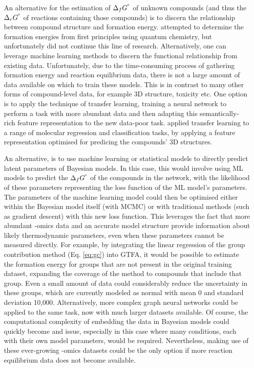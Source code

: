 \documentclass[10pt,letterpaper]{article}
\newcommand{\sdgf}{\Delta_fG^{\degree}}
\newcommand{\sdgr}{\Delta_rG^{\degree}}
\begin{document}
An alternative for the estimation of $\sdgf$ of unknown compounds (and thus the $\sdgr$ of reactions containing those compounds) is to discern the relationship between compound structure and formation energy.
\citet{quantum} attempted to determine the formation energies from first principles using quantum chemistry, but unfortunately did not continue this line of research. %
Alternatively, one can leverage machine learning methods to discern the functional relationship from existing data.
Unfortunately, due to the time-consuming process of gathering formation energy and reaction equilibrium data, there is not a large amount of data available on which to train these models.
This is in contrast to many other forms of compound-level data, for example 3D structure, toxicity etc. %
One option is to apply the technique of transfer learning, training a neural network to perform a task with more abundant data and then adapting this semantically-rich feature representation to the new data-poor task.
\cite{3dinfomax} applied transfer learning to a range of molecular regression and classification tasks, by applying a feature representation optimised for predicing the compounds' 3D structures.

An alternative, is to use machine learning or statistical models to directly predict latent parameters of Bayesian models.
In this case, this would involve using ML models to predict the $\sdgf$ of the compounds in the network, with the likelihood of these parameters representing the loss function of the ML model's parameters.
The parameters of the machine learning model could then be optimised either within the Bayesian model itself (with MCMC) or with traditional methods (such as gradient descent) with this new loss function.
This leverages the fact that more abundant -omics data and an accurate model structure provide information about likely thermodynamic parameters, even when these parameters cannot be measured directly.
For example, by integrating the linear regression of the group contribution method (Eq. \ref{eq:gc}) into GTFA, it would be possible to estimate the formation energy for groups that are not present in the original training dataset, expanding the coverage of the method to compounds that include that group.
Even a small amount of data could considerably reduce the uncertainty in these groups, which are currently modeled as normal with mean 0 and standard deviation 10,000.
Alternatively, more complex graph neural networks could be applied to the same task, now with much larger datasets available.
Of course, the computational complexity of embedding the data in Bayesian models could quickly become and issue, especially in this case where many conditions, each with their own model parameters, would be required.
Nevertheless, making use of these ever-growing -omics datasets could be the only option if more reaction equilibrium data does not become available.
\end{document}
